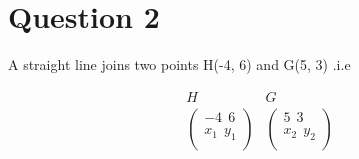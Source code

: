 \documentclass{article}
\begin{document}
\section*{Question 2} \begin{large}A straight line joins two points H(-4, 6) and G(5, 3) .i.e\end{large}
$$
    \begin{array}{c}
        H \\
        \begin{pmatrix}
            -4 \ \ 6    \\
            x_1 \ \ y_1 \\
        \end{pmatrix}
    \end{array}
    \begin{array}{c}
        G \\
        \begin{pmatrix}
            5 \ \ 3     \\
            x_2 \ \ y_2 \\
        \end{pmatrix}
    \end{array}
$$
\end{document}
